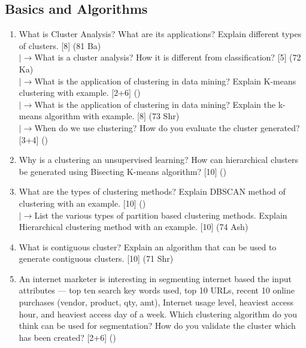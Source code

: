 \documentclass[12pt]{article}
\newcommand{\lb}{\\$\left|\rightarrow\right.$}
\begin{document}
  \subsection{Basics and Algorithms}
    \begin{enumerate}[topsep=0pt, noitemsep]
      \item What is Cluster Analysis? What are its applications? Explain different types of clusters. \hfill [8] (81 Ba)
        \lb What is a cluster analysis? How it is different from classification? \hfill [5] (72 Ka)
        \lb What is the application of clustering in data mining? Explain K-means clustering with example. \hfill [2+6] ()
        \lb What is the application of clustering in data mining? Explain the k-means algorithm with example. \hfill [8] (73 Shr)
        \lb When do we use clustering? How do you evaluate the cluster generated? \hfill [3+4] ()

      \item Why is a clustering an unsupervised learning? How can hierarchical clusters be generated using Bisecting K-means algorithm? \hfill [10] ()

      \item What are the types of clustering methods? Explain DBSCAN method of clustering with an example. \hfill [10] ()
        \lb List the various types of partition based clustering methods. Explain Hierarchical clustering method with an example. \hfill [10] (74 Ash)

      \item What is contiguous cluster? Explain an algorithm that can be used to generate contiguous clusters. \hfill [10] (71 Shr)

      \item An internet marketer is interesting in segmenting internet based the input attributes --- top ten search key words used, top 10 URLs, recent 10 online purchases (vendor, product, qty, amt), Internet usage level, heaviest access hour, and heaviest access day of a week. Which clustering algorithm do you think can be used for segmentation? How do you validate the cluster which has been created? \hfill [2+6] ()
    \end{enumerate}
\end{document}
